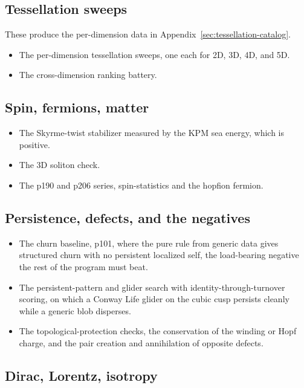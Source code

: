 \subsection{Tessellation sweeps}

These produce the per-dimension data in Appendix~\ref{sec:tessellation-catalog}.

\begin{itemize}
  \item The per-dimension tessellation sweeps, one each for 2D, 3D, 4D, and 5D.
  \item The cross-dimension ranking battery.
\end{itemize}

\subsection{Spin, fermions, matter}

\begin{itemize}
  \item The Skyrme-twist stabilizer measured by the KPM sea energy, which is positive.
  \item The 3D soliton check.
  \item The p190 and p206 series, spin-statistics and the hopfion fermion.
\end{itemize}

\subsection{Persistence, defects, and the negatives}

\begin{itemize}
  \item The churn baseline, p101, where the pure rule from generic data gives structured churn with no
  persistent localized self, the load-bearing negative the rest of the program must beat.
  \item The persistent-pattern and glider search with identity-through-turnover scoring, on which a Conway Life
  glider on the cubic cusp persists cleanly while a generic blob disperses.
  \item The topological-protection checks, the conservation of the winding or Hopf charge, and the pair
  creation and annihilation of opposite defects.
\end{itemize}

\subsection{Dirac, Lorentz, isotropy}

